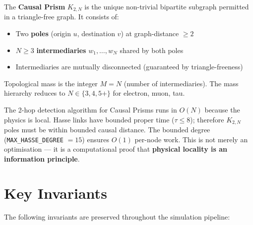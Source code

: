 \documentclass[11pt, a4paper, openany]{book}
\newcommand{\code}[1]{\texttt{#1}}
\newcounter{thm}[chapter]
\begin{document}
\begin{definition}
  The \textbf{Causal Prism} $K_{2,N}$ is the unique non-trivial bipartite
  subgraph permitted in a triangle-free graph.  It consists of:
  \begin{itemize}
    \item Two \textbf{poles} (origin $u$, destination $v$) at graph-distance $\geq 2$
    \item $N \geq 3$ \textbf{intermediaries} $w_1, \ldots, w_N$ shared by both poles
    \item Intermediaries are mutually disconnected (guaranteed by triangle-freeness)
  \end{itemize}
  Topological mass is the integer $M = N$ (number of intermediaries).
  The mass hierarchy reduces to $N \in \{3, 4, 5+\}$ for electron, muon, tau.
\end{definition}

\begin{definition}
  The 2-hop detection algorithm for Causal Prisms runs in $O(N)$ because the
  physics is local.  Hasse links have bounded proper time ($\tau \leq 8$);
  therefore $K_{2,N}$ poles must be within bounded causal distance.  The bounded
  degree (\code{MAX\_HASSE\_DEGREE} $= 15$) ensures $O(1)$ per-node work.
  This is not merely an optimisation --- it is a computational proof that
  \textbf{physical locality is an information principle}.
\end{definition}

\section{Key Invariants}

The following invariants are preserved throughout the simulation pipeline:
\end{document}
